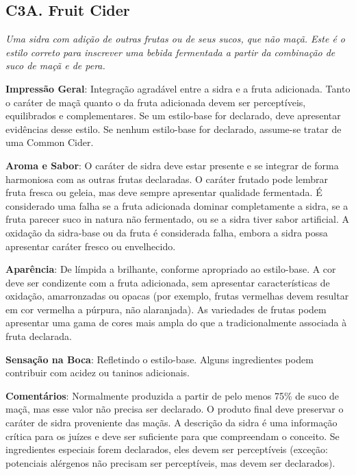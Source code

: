 \subsection*{C3A. Fruit Cider}

\textit{Uma sidra com adição de outras frutas ou de seus sucos, que não maçã. Este é o estilo correto para inscrever uma bebida fermentada a partir da combinação de suco de maçã e de pera.}

\textbf{Impressão Geral}: Integração agradável entre a sidra e a fruta adicionada. Tanto o caráter de maçã quanto o da fruta adicionada devem ser perceptíveis, equilibrados e complementares. Se um estilo-base for declarado, deve apresentar evidências desse estilo. Se nenhum estilo-base for declarado, assume-se tratar de uma Common Cider.

\textbf{Aroma e Sabor}: O caráter de sidra deve estar presente e se integrar de forma harmoniosa com as outras frutas declaradas. O caráter frutado pode lembrar fruta fresca ou geleia, mas deve sempre apresentar qualidade fermentada. É considerado uma falha se a fruta adicionada dominar completamente a sidra, se a fruta parecer suco in natura não fermentado, ou se a sidra tiver sabor artificial. A oxidação da sidra-base ou da fruta é considerada falha, embora a sidra possa apresentar caráter fresco ou envelhecido.

\textbf{Aparência}: De límpida a brilhante, conforme apropriado ao estilo-base. A cor deve ser condizente com a fruta adicionada, sem apresentar características de oxidação, amarronzadas ou opacas (por exemplo, frutas vermelhas devem resultar em cor vermelha a púrpura, não alaranjada). As variedades de frutas podem apresentar uma gama de cores mais ampla do que a tradicionalmente associada à fruta declarada.

\textbf{Sensação na Boca}: Refletindo o estilo-base. Alguns ingredientes podem contribuir com acidez ou taninos adicionais.

\textbf{Comentários}: Normalmente produzida a partir de pelo menos 75\% de suco de maçã, mas esse valor não precisa ser declarado. O produto final deve preservar o caráter de sidra proveniente das maçãs. A descrição da sidra é uma informação crítica para os juízes e deve ser suficiente para que compreendam o conceito. Se ingredientes especiais forem declarados, eles devem ser perceptíveis (exceção: potenciais alérgenos não precisam ser perceptíveis, mas devem ser declarados).

